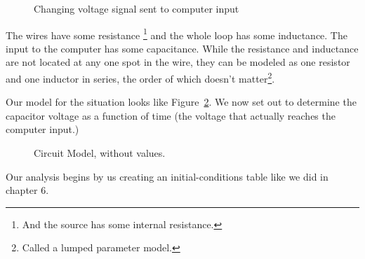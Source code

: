 \begin{figure}[H]
\begin{center}
\caption{Changing voltage signal sent to computer input}
\label{F:7EX}
\end{center}
\end{figure}

The wires have some resistance \footnote{And the source has some internal resistance.} and the whole loop has some inductance. The input to the computer has some capacitance. While the resistance and inductance are not located at any one spot in the wire, they can be modeled as one resistor and one inductor in series, the order of which doesn't matter\footnote{Called a lumped parameter model.}.
\par
Our model for the situation looks like Figure~\ref{F:7EX2}. We now set out to determine the capacitor voltage as a function of time (the voltage that actually reaches the computer input.) 

\begin{figure}[H]
\begin{center}
\caption{Circuit Model, without values.}
\label{F:7EX2}
\end{center}
\end{figure}

Our analysis begins by us creating an initial-conditions table like we did in chapter 6.\linebreak

